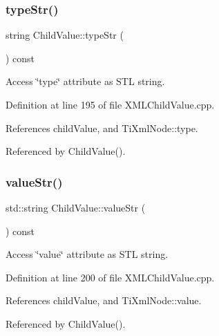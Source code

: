 \subsubsection{\texorpdfstring{type\+Str()}{typeStr()}}
{\footnotesize\ttfamily string Child\+Value\+::type\+Str (\begin{DoxyParamCaption}{ }\end{DoxyParamCaption}) const}



Access \char`\"{}type\char`\"{} attribute as S\+TL string. 



Definition at line 195 of file X\+M\+L\+Child\+Value.\+cpp.



References child\+Value, and Ti\+Xml\+Node\+::type.



Referenced by Child\+Value().

\hypertarget{struct_d_d4hep_1_1_x_m_l_1_1_child_value_afb03e28f5125a4d706d77e7e9da78bc0}{}\label{struct_d_d4hep_1_1_x_m_l_1_1_child_value_afb03e28f5125a4d706d77e7e9da78bc0} 
\subsubsection{\texorpdfstring{value\+Str()}{valueStr()}}
{\footnotesize\ttfamily std\+::string Child\+Value\+::value\+Str (\begin{DoxyParamCaption}{ }\end{DoxyParamCaption}) const}



Access \char`\"{}value\char`\"{} attribute as S\+TL string. 



Definition at line 200 of file X\+M\+L\+Child\+Value.\+cpp.



References child\+Value, and Ti\+Xml\+Node\+::value.



Referenced by Child\+Value().

\hypertarget{struct_d_d4hep_1_1_x_m_l_1_1_child_value_a388de69adb50fd55b33d695c0a8d73f8}{}\label{struct_d_d4hep_1_1_x_m_l_1_1_child_value_a388de69adb50fd55b33d695c0a8d73f8} 
